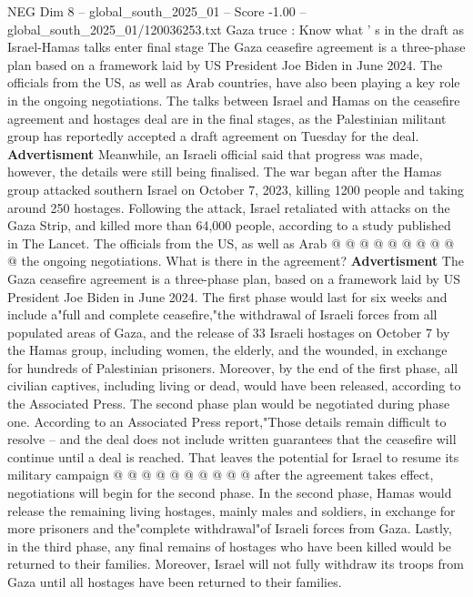 \begin{textsample}{NEG Dim 8 – global\_south\_2025\_01 – Score -1.00 – global\_south\_2025\_01/120036253.txt}  \label{ex:f8_neg_133}
Gaza truce : Know what ' s in the draft as Israel-Hamas talks enter final stage The Gaza ceasefire agreement is a three-phase plan based on a framework laid by US President Joe Biden in June 2024.
The officials from the US, as well as Arab countries, have also been playing a key role in the ongoing negotiations.
The talks between Israel and Hamas on the ceasefire agreement and hostages deal are in the final stages, as the Palestinian militant group has reportedly accepted a draft agreement on Tuesday for the deal. \textbf{Advertisment} Meanwhile, an Israeli official said that progress was made, however, the details were still being finalised.
The war began after the Hamas group attacked southern Israel on October 7, 2023, killing 1200 people and taking around 250 hostages.
Following the attack, Israel retaliated with attacks on the Gaza Strip, and killed more than 64,000 people, according to a study published in The Lancet.
The officials from the US, as well as Arab @ @ @ @ @ @ @ @ @ @ the ongoing negotiations.
What is there in the agreement? \textbf{Advertisment} The Gaza ceasefire agreement is a three-phase plan, based on a framework laid by US President Joe Biden in June 2024.
The first phase would last for six weeks and include a"full and complete ceasefire,"the withdrawal of Israeli forces from all populated areas of Gaza, and the release of 33 Israeli hostages on October 7 by the Hamas group, including women, the elderly, and the wounded, in exchange for hundreds of Palestinian prisoners.
Moreover, by the end of the first phase, all civilian captives, including living or dead, would have been released, according to the Associated Press.
The second phase plan would be negotiated during phase one.
According to an Associated Press report,"Those details remain difficult to resolve -- and the deal does not include written guarantees that the ceasefire will continue until a deal is reached.
That leaves the potential for Israel to resume its military campaign @ @ @ @ @ @ @ @ @ @ after the agreement takes effect, negotiations will begin for the second phase.
In the second phase, Hamas would release the remaining living hostages, mainly males and soldiers, in exchange for more prisoners and the"complete withdrawal"of Israeli forces from Gaza.
Lastly, in the third phase, any final remains of hostages who have been killed would be returned to their families.
Moreover, Israel will not fully withdraw its troops from Gaza until all hostages have been returned to their families.

\end{textsample}

